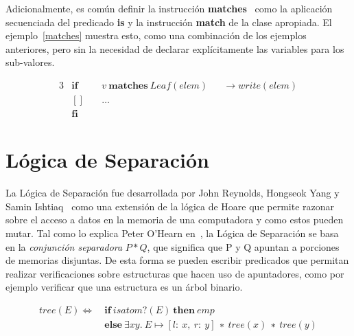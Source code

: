 Adicionalmente, es común definir la instrucción \textbf{matches}~\cite{ravelo}
como la aplicación secuenciada del predicado \textbf{is} y la instrucción
\textbf{match} de la clase apropiada. El ejemplo~\ref{matches} muestra esto,
como una combinación de los ejemplos anteriores, pero sin la necesidad de
declarar explícitamente las variables para los sub-valores.

\begin{alignat}{3}
&\boldsymbol{if}\ && v\ \boldsymbol{matches}\ Leaf(elem)         && \rightarrow write(elem) \nonumber \\
&\boldsymbol{[]}\ && \ldots                                                        \label{matches} \\
&\boldsymbol{fi} \nonumber
\end{alignat}


\section{Lógica de Separación}

La Lógica de Separación fue desarrollada por John Reynolds, Hongseok Yang y
Samin Ishtiaq~\cite{seplogpaper1,seplogpaper2,seplogpaper3} como una
extensión de la lógica de Hoare que permite razonar sobre el acceso a datos en
la memoria de una computadora y como estos pueden mutar. Tal como lo explica
Peter O'Hearn en~\cite{separation-logic}, la Lógica de Separación se basa en
la \textit{conjunción separadora} $P * Q$, que significa que P y Q apuntan a
porciones de memorias disjuntas. De esta forma se pueden escribir predicados
que permitan realizar verificaciones sobre estructuras que hacen uso de
apuntadores, como por ejemplo verificar que una estructura es un árbol
binario.

\begin{align}
  tree(E) \Longleftrightarrow\ &\boldsymbol{if}\ isatom?(E)\ \boldsymbol{then}\ emp \label{eq:treesl}\\
             &\boldsymbol{else}\ \exists xy.\ E\mapsto[l:\ x,\ r:\ y]\ ∗\ tree(x)\ ∗\ tree(y) \nonumber
\end{align}

